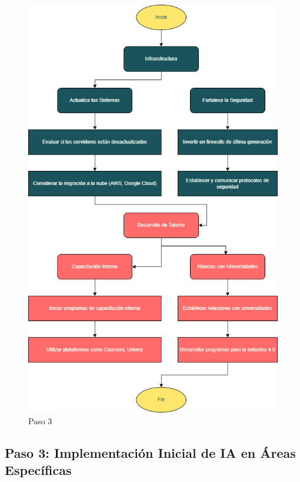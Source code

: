 \documentclass[
  letterpaper,
]{book}
\begin{document}
\begin{figure}[H]

{\centering \includegraphics{Img/paso3.png}

}

\caption{Paso 3}

\end{figure}%

\subsection{Paso 3: Implementación Inicial de IA en Áreas
Específicas}\label{paso-3-implementaciuxf3n-inicial-de-ia-en-uxe1reas-especuxedficas}
\end{document}
